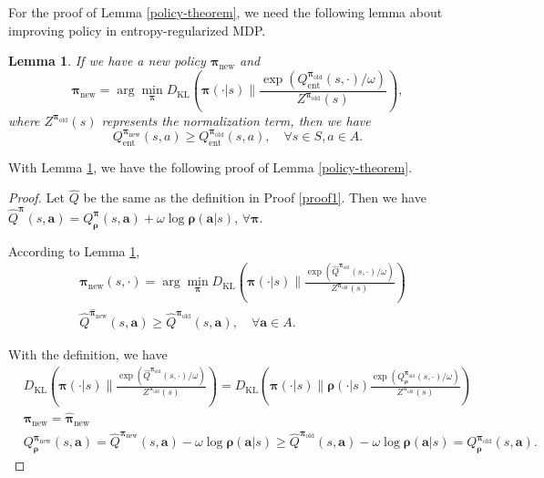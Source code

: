 \documentclass{article}
\newtheorem{lemma}{Lemma}
\begin{document}
	For the proof of Lemma \ref{policy-theorem}, we need the following lemma \citep{SAC} about improving policy in entropy-regularized MDP.
	\begin{lemma}\label{improve-lemma}
		If we have a new policy ${\bm{\pi}}_{\operatorname{new}}$ and
		\[
		{\bm{\pi}}_{\operatorname{new}} = \arg \min_{\bm{\pi}} D_{\operatorname{KL}}\left( {\bm{\pi}}(\cdot|s) \|  \frac{\exp\left( Q^{{\bm{\pi}}_{\operatorname{{old}}}}_{\operatorname{ent}}(s,\cdot) / \omega \right)}{Z^{{\bm{\pi}}_{\operatorname{{old}}}}(s)} \right), 
		\] 
		where $Z^{{\bm{\pi}}_{\operatorname{{old}}}}(s)$ represents the normalization term, then we have
		\[
		Q^{{\bm{\pi}}_{\operatorname{{new}}} }_{\operatorname{ent}}(s,a) \geq Q^{{\bm{\pi}}_{\operatorname{{old}}} }_{\operatorname{ent}}(s,a),\quad \forall s \in S, a \in A.
		\]
	\end{lemma}
	
	With Lemma \ref{improve-lemma}, we have the following proof of Lemma \ref{policy-theorem}.
	
	\begin{proof}
		Let $\hat{Q}$ be the same as the definition in Proof \ref{proof1}. Then we have
		$\hat{Q}^{{\bm{\pi}}}(s,\bm{a}) = Q^{{\bm{\pi}}}_{\bm{\rho}}(s,\bm{a}) + \omega \log {\bm{\rho}}(\bm{a}|s),\,\forall {\bm{\pi}}$.
		
		According to Lemma \ref{improve-lemma},
		\begin{align*}
			&\hat{{\bm{\pi}}}_{\operatorname{{new}}}(s,\cdot) = \arg \min_{\bm{\pi}} D_{\operatorname{KL}}\left( {\bm{\pi}}(\cdot|s) \|  \frac{\exp\left( \hat{Q}^{{\bm{\pi}}_{\operatorname{{old}}}}(s,\cdot) / \omega \right)}{Z^{{\bm{\pi}}_{\operatorname{{old}}}}(s)} \right) \\
			& \hat{Q}^{\hat{{\bm{\pi}}}_{\operatorname{{new}}}}(s,\bm{a}) \geq \hat{Q}^{{\bm{\pi}}_{\operatorname{{old}}}}(s,\bm{a}),\quad \forall \bm{a} \in A.
		\end{align*}
		
		With the definition, we have 
		\begin{align*}
			& D_{\operatorname{KL}} \left( {\bm{\pi}}(\cdot|s) \|  \frac{\exp( \hat{Q}^{{\bm{\pi}}_{\operatorname{{old}}}}(s,\cdot) / \omega )}{Z^{{\bm{\pi}}_{\operatorname{{old}}}}(s)} \right)  =  D_{\operatorname{KL}} \left( {\bm{\pi}}(\cdot|s) \| {\bm{\rho}}(\cdot|s) \frac{\exp( Q^{{\bm{\pi}}_{\operatorname{{old}}}}_{\bm{\rho}}(s,\cdot) / \omega )}{Z^{{\bm{\pi}}_{\operatorname{{old}}}}(s)} \right) \\
			& {\bm{\pi}}_{\operatorname{{new}}} = \hat{{\bm{\pi}}}_{\operatorname{{new}}} \\
			& Q^{{\bm{\pi}}_{\operatorname{{new}}}}_{\bm{\rho}}(s,\bm{a}) = \hat{Q}^{{\bm{\pi}}_{\operatorname{{new}}}}(s,\bm{a}) - \omega \log {\bm{\rho}}(\bm{a}|s) \geq \hat{Q}^{{\bm{\pi}}_{\operatorname{{old}}}}(s,\bm{a}) - \omega \log {\bm{\rho}}(\bm{a}|s)  = Q^{{\bm{\pi}}_{\operatorname{old}}}_{\bm{\rho}}(s,\bm{a}) .
		\end{align*}
	\end{proof}
	
\end{document}
